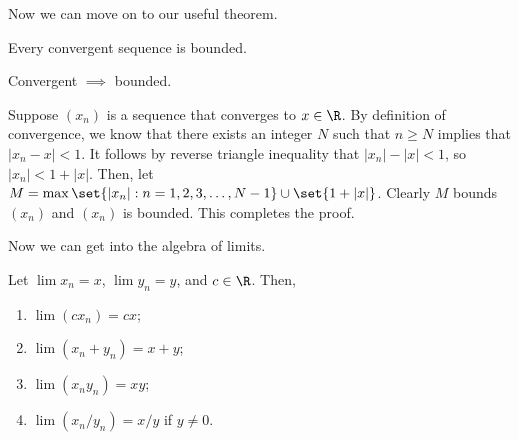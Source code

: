 \documentclass[class=article, crop=false]{standalone}
\begin{document}
Now we can move on to our useful theorem.
\begin{thm}{\label{thm:convergent means bounded}}
    Every convergent sequence is bounded.
\end{thm}
\begin{slogan}
    Convergent $\implies$ bounded.
\end{slogan}
\begin{pf}
    Suppose $(x_n)$ is a sequence that converges to $x \in \R$. By definition of convergence, we know that there exists an integer $N$ such that $n \geq N$ implies that $|x_n - x| < 1$. It follows by reverse triangle inequality that $|x_n|-|x| < 1$, so $|x_n| < 1+ |x|$. Then, let $M = \max \set{|x_n| : n=1,2,3,\ldots, N-1} \cup \set{1+|x|}$. Clearly $M$ bounds $(x_n)$ and $(x_n)$ is bounded. This completes the proof.
\end{pf}

Now we can get into the algebra of limits.
\begin{thm}
    Let $\lim x_n = x$, $\lim y_n = y$, and $c \in \R$. Then,
        \begin{enumerate}[\normalfont(i)]
            \item $\lim (c x_n) = cx$;
            \item $\lim(x_n + y_n) = x + y$;
            \item $\lim(x_n y_n) = xy$;
            \item $\lim(x_n/y_n) = x/y$ if $y \neq 0$.
        \end{enumerate}
\end{thm}
\end{document}
